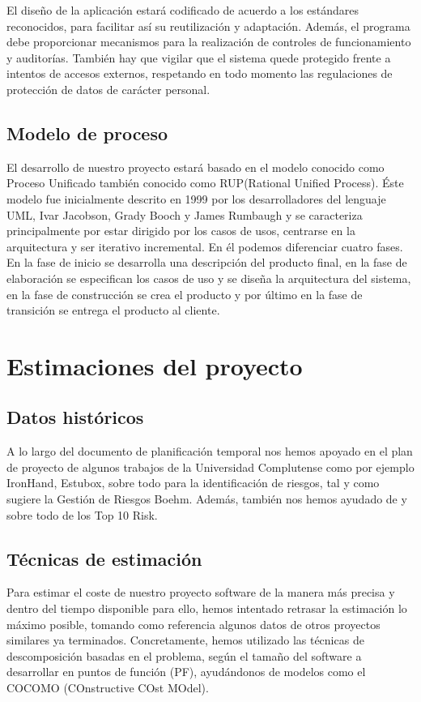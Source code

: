 \documentclass[11pt, a4paper, twoside, titlepage]{article}
\begin{document}
			El diseño de la aplicación estará codificado de acuerdo a los estándares reconocidos, para facilitar así su reutilización y adaptación. Además, el programa debe proporcionar mecanismos para la realización de controles de funcionamiento y auditorías. También hay que vigilar que el sistema quede protegido frente a intentos de accesos externos, respetando en todo momento las regulaciones de protección de datos de carácter personal.

		\subsection{Modelo de proceso}
		El desarrollo de nuestro proyecto estará basado en el modelo conocido como Proceso Unificado también conocido como RUP(Rational Unified Process). Éste modelo fue inicialmente descrito en 1999 por los desarrolladores del lenguaje UML, Ivar Jacobson, Grady Booch y James Rumbaugh y se caracteriza principalmente por estar dirigido por los casos de usos, centrarse en la arquitectura y ser iterativo incremental. En él podemos diferenciar cuatro fases. En la fase de inicio se desarrolla una descripción del producto final, en la fase de elaboración se especifican los casos de uso y se diseña la arquitectura del sistema, en la fase de construcción se crea el producto y por último en la fase de transición se entrega el producto al cliente.

	\section{Estimaciones del proyecto}
		\subsection{Datos históricos}
		A lo largo del documento de planificación temporal nos hemos apoyado en el plan de proyecto de algunos trabajos de la Universidad Complutense como por ejemplo IronHand, Estubox, sobre todo para la identificación de riesgos, tal y como sugiere la Gestión de Riesgos Boehm. Además, también nos hemos ayudado de \cite{PSMAN} y sobre todo de los Top 10 Risk.
		\subsection{Técnicas de estimación}
		Para estimar el coste de nuestro proyecto software de la manera más precisa y dentro del tiempo disponible para ello, hemos intentado retrasar la estimación lo máximo posible, tomando como referencia algunos datos de otros proyectos similares ya terminados. Concretamente, hemos utilizado las técnicas de descomposición basadas en el problema, según el tamaño del software a desarrollar en puntos de función (PF), ayudándonos de modelos como el COCOMO (COnstructive COst MOdel).
\end{document}
